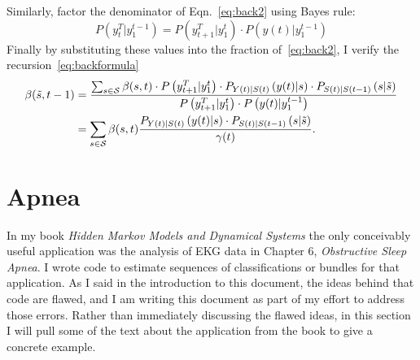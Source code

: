 \documentclass[]{article}
\newcommand{\ts}[3]{#1_{#2}^{#3}}                    %
\newcommand{\ti}[2]{{#1}{(#2)}}                  %
\newcommand{\states}{{\cal{S}}}
\begin{document}
Similarly, factor the denominator of Eqn.~\eqref{eq:back2} using
Bayes rule:
\begin{equation*}
  P \left(\ts{y}{t}{T}|\ts{y}{1}{t-1} \right) = P
  \left(\ts{y}{t+1}{T}|\ts{y}{1}{t}  \right) \cdot {P \left(
  \ti{y}{t}|\ts{y}{1}{t-1}\right)}
\end{equation*}
Finally by substituting these values into the fraction
of~\eqref{eq:back2}, I verify the recursion~\eqref{eq:backformula}
\begin{align}
  \label{eq:back3} \beta({\tilde s},t-1) &= \frac{\sum_{s\in\states}
    \beta(s,t) \cdot P \left(\ts{y}{t+1}{T}|\ts{y}{1}{t} \right)
    \cdot P_{\ti{Y}{t}|\ti{S}{t}} \left(\ti{y}{t}|s \right) \cdot
    P_{\ti{S}{t}|\ti{S}{t-1}} \left(s|{\tilde s} \right)} {P
    \left(\ts{y}{t+1}{T}|\ts{y}{1}{t} \right) \cdot {P \left(
        \ti{y}{t}|\ts{y}{1}{t-1}\right)}} \\
  \label{eq:back4} &= \sum_{s\in\states} \beta(s,t) \frac{
    P_{\ti{Y}{t}|\ti{S}{t}} \left(\ti{y}{t}|s \right) \cdot
    P_{\ti{S}{t}|\ti{S}{t-1}} \left(s|{\tilde s} \right)} {\ti{\gamma}{t}}.
\end{align}

\section{Apnea}\label{sec:Apnea}

In my book \emph{Hidden Markov Models and Dynamical Systems} the only
conceivably useful application was the analysis of EKG data in Chapter
6, \emph{Obstructive Sleep Apnea}.  I wrote code to estimate sequences
of classifications or bundles for that application.  As I said in the
introduction to this document, the ideas behind that code are flawed,
and I am writing this document as part of my effort to address those
errors.  Rather than immediately discussing the flawed ideas, in this
section I will pull some of the text about the application from the
book to give a concrete example.
\end{document}
